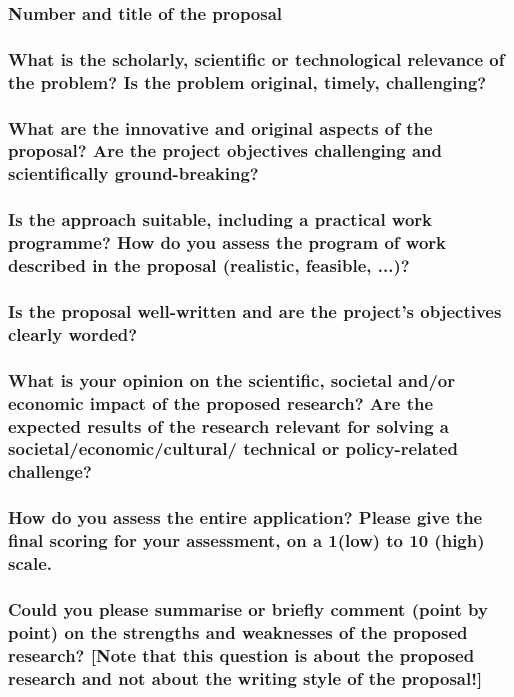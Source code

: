 \subsubsection*{Number and title of the proposal}

\subsubsection*{What is the scholarly, scientific or technological relevance of the problem? Is the problem original, timely, challenging?}

\subsubsection*{What are the innovative and original aspects of the proposal? Are the project objectives challenging and scientifically ground-breaking?}

\subsubsection*{Is the approach suitable, including a practical work programme? How do you assess the program of work described in the proposal (realistic, feasible, ...)?}

\subsubsection*{Is the proposal well-written and are the project’s objectives clearly worded?}

\subsubsection*{What is your opinion on the scientific, societal and/or economic impact of the proposed research? Are the expected results of the research relevant for solving a societal/economic/cultural/ technical or policy-related challenge?}

\subsubsection*{How do you assess the entire application? Please give the final scoring for your assessment, on a 1(low) to 10 (high) scale.}

\subsubsection*{Could you please summarise or briefly comment (point by point) on the strengths and weaknesses of the proposed research? [Note that this question is about the proposed research and not about the writing style of the proposal!]}
